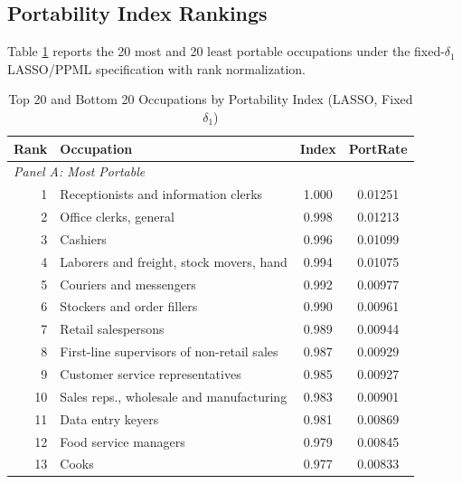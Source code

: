 \documentclass[12pt]{article}
\begin{document}
\subsection{Portability Index Rankings}
\label{sec:results_rankings}

Table \ref{tab:top_bottom} reports the 20 most and 20 least portable occupations under the fixed-$\delta_1$ LASSO/PPML specification with rank normalization.

\begin{table}[H]
\centering
\caption{Top 20 and Bottom 20 Occupations by Portability Index (LASSO, Fixed $\delta_1$)}
\label{tab:top_bottom}
\footnotesize
\renewcommand{\arraystretch}{0.85}
\linespread{1.0}\selectfont
\begin{tabular}{rlcc}
\toprule
\textbf{Rank} & \textbf{Occupation} & \textbf{Index} & \textbf{PortRate} \\
\midrule
\multicolumn{4}{l}{\textit{Panel A: Most Portable}} \\
1  & Receptionists and information clerks          & 1.000 & 0.01251 \\
2  & Office clerks, general                        & 0.998 & 0.01213 \\
3  & Cashiers                                      & 0.996 & 0.01099 \\
4  & Laborers and freight, stock movers, hand       & 0.994 & 0.01075 \\
5  & Couriers and messengers                       & 0.992 & 0.00977 \\
6  & Stockers and order fillers                    & 0.990 & 0.00961 \\
7  & Retail salespersons                           & 0.989 & 0.00944 \\
8  & First-line supervisors of non-retail sales    & 0.987 & 0.00929 \\
9  & Customer service representatives              & 0.985 & 0.00927 \\
10 & Sales reps., wholesale and manufacturing      & 0.983 & 0.00901 \\
11 & Data entry keyers                             & 0.981 & 0.00869 \\
12 & Food service managers                         & 0.979 & 0.00845 \\
13 & Cooks                                         & 0.977 & 0.00833 \\

\end{tabular}
\end{table}
\end{document}
